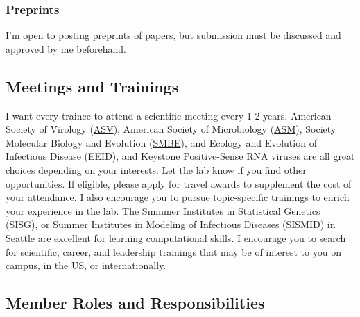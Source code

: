 \documentclass[10pt, a4paper, twocolumn]{article} %
\begin{document}
\subsubsection{Preprints}
I'm open to posting preprints of papers, but submission must be discussed and approved by me beforehand.

\subsection{Meetings and Trainings}
I want every trainee to attend a scientific meeting every 1-2 years. American Society of Virology (\href{https://asv.org/}{ASV}), American Society of Microbiology (\href{https://asm.org/}{ASM}), Society Molecular Biology and Evolution (\href{https://smbe.org/smbe/}{SMBE}), and Ecology and Evolution of Infectious Disease (\href{https://www.eeidconference2021.org/}{EEID}), and Keystone Positive-Sense RNA viruses are all great choices depending on your interests. Let the lab know if you find other opportunities. If eligible, please apply for travel awards to supplement the cost of your attendance.\newline
I also encourage you to pursue topic-specific trainings to enrich your experience in the lab. The Smmmer Institutes in Statistical Genetics (SISG), or Summer Institutes in Modeling of Infectious Diseases (SISMID) in Seattle are excellent for learning computational skills. I encourage you to search for scientific, career, and leadership trainings that may be of interest to you on campus, in the US, or internationally.

\subsection{Member Roles and Responsibilities}
\end{document}
